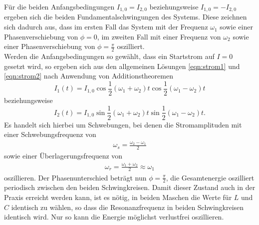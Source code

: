 Für die beiden Anfangsbedingungen $I_{1,0} = I_{2,0}$ beziehungsweise $I_{1,0} = -I_{2,0}$ ergeben sich die beiden Fundamentalschwingungen des Systems.
Diese zeichnen sich dadurch aus, dass im ersten Fall das System mit der Frequenz $\omega_1$ sowie einer Phasenverschiebung von $\phi = 0$, im zweiten Fall mit einer Frequenz von $\omega_2$ sowie einer Phasenverschiebung von $\phi = \frac{\pi}{2}$ oszilliert. \\
Werden die Anfangsbedingungen so gewählt, dass ein Startstrom auf $I=0$ gesetzt wird, so ergeben sich aus den allgemeinen Lösungen \eqref{eqn:strom1} und \eqref{eqn:strom2} nach Anwendung von Additionstheoremen
\begin{equation}
  I_1(t) = I_{1,0} \cos{\frac{1}{2} (\omega_1 + \omega_2) t} \cos{\frac{1}{2} (\omega_1 - \omega_2) t}
\end{equation}
beziehungsweise
\begin{equation}
  I_2(t) = I_{1,0} \sin{\frac{1}{2} (\omega_1 + \omega_2) t} \sin{\frac{1}{2} (\omega_1 - \omega_2) t}.
\end{equation}
Es handelt sich hierbei um Schwebungen, bei denen die Stromamplituden mit einer Schwebungsfrequenz von
\begin{align}
  \omega_s = \frac{\omega_2 - \omega_1}{2}
  \label{eqn:omega_s}
\end{align}
sowie einer Überlagerungsfrequenz von
\begin{align}
  \omega_r = \frac{\omega_1 + \omega_2}{2} \approx \omega_1
  \label{eqn:omega_r}
\end{align}
oszillieren.
Der Phasenunterschied beträgt nun $\phi = \frac{\pi}{2}$, die Gesamtenergie oszilliert periodisch zwischen den beiden Schwingkreisen.
Damit dieser Zustand auch in der Praxis erreicht werden kann, ist es nötig, in beiden Maschen die Werte für $L$ und $C$ identisch zu wählen, so dass die Resonanzfrequenz in beiden Schwingkreisen identisch wird.
Nur so kann die Energie möglichst verlustfrei oszillieren.
